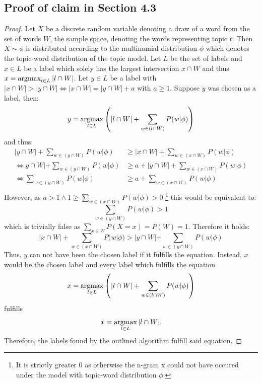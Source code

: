 \subsection{Proof of claim in Section 4.3}
\begin{proof}
\label{labelproof}
Let $X$ be a discrete random variable denoting a draw of a word from the set of words $W$, the sample space, denoting the words representing topic $t$. Then $X \sim \phi$ is distributed according to the multinomial distribution $\phi$ which denotes the topic-word distribution of the topic model. Let $L$ be the set of labels and $x \in L$ be a label which solely has the largest intersection $x \cap W$ and thus $x = \operatorname*{argmax}_{l \in L} |l \cap W|$. Let $y \in L$ be a label with $|x \cap W| > |y \cap W| \Leftrightarrow |x \cap W| = |y \cap W| + a$ with $a \geq 1$. Suppose $y$ was chosen as a label, then:
\begin{equation}
y = \operatorname*{argmax}_{l \in L} \left( |l \cap W| + \sum_{w \in (l \cap W)} P(w|\phi) \right)
\end{equation}
and thus:
\begin{align}
|y \cap W| + \sum_{w \in (y \cap W)} P(w|\phi) &\geq |x \cap W| + \sum_{w \in (x \cap W)} P(w|\phi) \\
\Leftrightarrow y \cap W| + \sum_{w \in (y \cap W)} P(w|\phi) &\geq a + |y \cap W| + \sum_{w \in (x \cap W)} P(w|\phi) \\
\Leftrightarrow \sum_{w \in (y \cap W)} P(w|\phi) &\geq a + \sum_{w \in (x \cap W)} P(w|\phi) \\
\end{align}
However, as $a > 1 \land 1 \geq \sum_{w \in (x \cap W)} P(w|\phi) > 0$ \footnote{It is strictly greater 0 as otherwise the n-gram x could not have occured under the model with topic-word distribution $\phi$.} this would be equivalent to:
\begin{equation}
\sum_{w \in (y \cap W)} P(w|\phi) > 1
\end{equation} which is trivially false as $\sum_{x \in W} P(X=x) = P(W) = 1$. Therefore it holds:
\begin{equation}
|x \cap W| + \sum_{w \in (x \cap W)} P(w|\phi) > |y \cap W| + \sum_{w \in (y \cap W)} P(w|\phi)
\end{equation}
Thus, $y$ can not have been the chosen label if it fulfills the equation. Instead, $x$ would be the chosen label and every label which fulfills the equation \begin{equation}
x = \operatorname*{argmax}_{l \in L} \left( |l \cap W| + \sum_{w \in (l \cap W)} P(w|\phi) \right)
\end{equation} fulfills 
\begin{equation}x = \operatorname*{argmax}_{l \in L} |l \cap W|.
\end{equation} Therefore, the labels found by the outlined algorithm fulfill said equation.
\end{proof}

